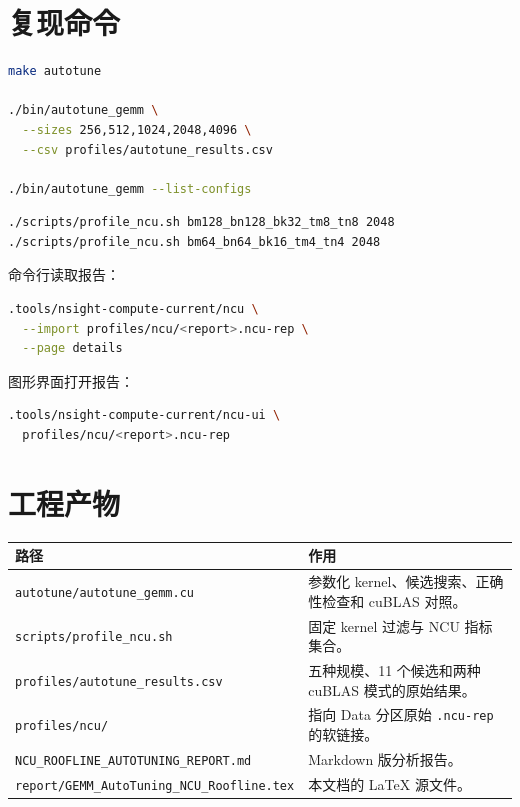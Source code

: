 \documentclass[UTF8,11pt,a4paper,fontset=fandol]{ctexart}
\newcommand{\code}[1]{\nolinkurl{#1}}
\begin{document}
\appendix

\section{复现命令}

\begin{lstlisting}[style=cuda,language=bash,caption={编译并执行完整 Auto-Tuning}]
make autotune

./bin/autotune_gemm \
  --sizes 256,512,1024,2048,4096 \
  --csv profiles/autotune_results.csv

./bin/autotune_gemm --list-configs
\end{lstlisting}

\begin{lstlisting}[style=cuda,language=bash,caption={采集两个 NCU 对照报告}]
./scripts/profile_ncu.sh bm128_bn128_bk32_tm8_tn8 2048
./scripts/profile_ncu.sh bm64_bn64_bk16_tm4_tn4 2048
\end{lstlisting}

命令行读取报告：

\begin{lstlisting}[style=cuda,language=bash]
.tools/nsight-compute-current/ncu \
  --import profiles/ncu/<report>.ncu-rep \
  --page details
\end{lstlisting}

图形界面打开报告：

\begin{lstlisting}[style=cuda,language=bash]
.tools/nsight-compute-current/ncu-ui \
  profiles/ncu/<report>.ncu-rep
\end{lstlisting}

\section{工程产物}

\begin{table}[H]
\centering
\begin{tabularx}{\textwidth}{lX}
\toprule
路径 & 作用 \\
\midrule
\code{autotune/autotune_gemm.cu} & 参数化 kernel、候选搜索、正确性检查和 cuBLAS 对照。 \\
\code{scripts/profile_ncu.sh} & 固定 kernel 过滤与 NCU 指标集合。 \\
\code{profiles/autotune_results.csv} & 五种规模、11 个候选和两种 cuBLAS 模式的原始结果。 \\
\code{profiles/ncu/} & 指向 Data 分区原始 \code{.ncu-rep} 的软链接。 \\
\code{NCU_ROOFLINE_AUTOTUNING_REPORT.md} & Markdown 版分析报告。 \\
\code{report/GEMM_AutoTuning_NCU_Roofline.tex} & 本文档的 LaTeX 源文件。 \\
\bottomrule
\end{tabularx}
\end{table}
\end{document}
